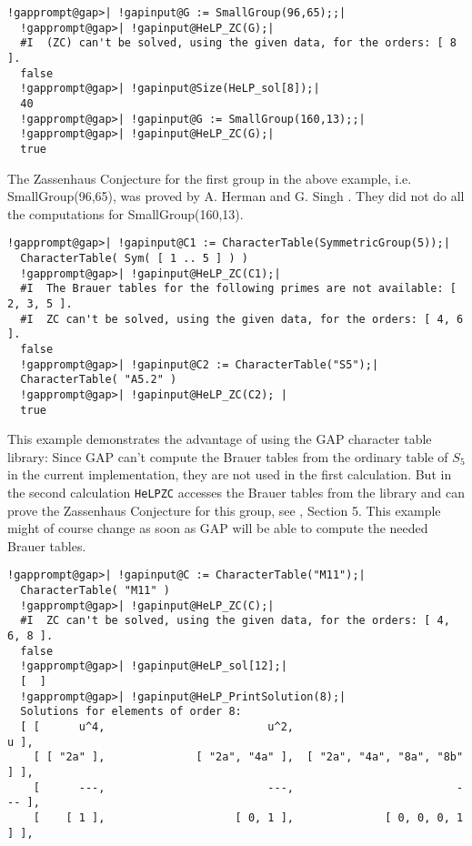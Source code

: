 \documentclass[a4paper,11pt]{report}
\begin{document}
{{\begin{Verbatim}[commandchars=!@|,fontsize=\small,frame=single,label=Example]
  !gapprompt@gap>| !gapinput@G := SmallGroup(96,65);;|
  !gapprompt@gap>| !gapinput@HeLP_ZC(G);|
  #I  (ZC) can't be solved, using the given data, for the orders: [ 8 ].
  false
  !gapprompt@gap>| !gapinput@Size(HeLP_sol[8]);|
  40
  !gapprompt@gap>| !gapinput@G := SmallGroup(160,13);;|
  !gapprompt@gap>| !gapinput@HeLP_ZC(G);|
  true
\end{Verbatim}
 The Zassenhaus Conjecture for the first group in the above example, i.e.
SmallGroup(96,65), was proved by A. Herman and G. Singh \cite{HermanSingh}. They did not do all the computations for SmallGroup(160,13). 
\begin{Verbatim}[commandchars=!@|,fontsize=\small,frame=single,label=Example]
  !gapprompt@gap>| !gapinput@C1 := CharacterTable(SymmetricGroup(5));|
  CharacterTable( Sym( [ 1 .. 5 ] ) )
  !gapprompt@gap>| !gapinput@HeLP_ZC(C1);|
  #I  The Brauer tables for the following primes are not available: [ 2, 3, 5 ].
  #I  ZC can't be solved, using the given data, for the orders: [ 4, 6 ].
  false
  !gapprompt@gap>| !gapinput@C2 := CharacterTable("S5");|
  CharacterTable( "A5.2" )
  !gapprompt@gap>| !gapinput@HeLP_ZC(C2); |
  true
\end{Verbatim}
 This example demonstrates the advantage of using the GAP character table
library: Since GAP can't compute the Brauer tables from the ordinary table of $S_5$ in the current implementation, they are not used in the first calculation. But
in the second calculation \texttt{HeLP{\textunderscore}ZC} accesses the Brauer tables from the library and can prove the Zassenhaus
Conjecture for this group, see \cite{HertweckBrauer}, Section 5. This example might of course change as soon as GAP will be able
to compute the needed Brauer tables. 
\begin{Verbatim}[commandchars=!@|,fontsize=\small,frame=single,label=Example]
  !gapprompt@gap>| !gapinput@C := CharacterTable("M11");|
  CharacterTable( "M11" )
  !gapprompt@gap>| !gapinput@HeLP_ZC(C);|
  #I  ZC can't be solved, using the given data, for the orders: [ 4, 6, 8 ].
  false
  !gapprompt@gap>| !gapinput@HeLP_sol[12];|
  [  ]
  !gapprompt@gap>| !gapinput@HeLP_PrintSolution(8);|
  Solutions for elements of order 8:
  [ [      u^4,                         u^2,                           u ],
    [ [ "2a" ],              [ "2a", "4a" ],  [ "2a", "4a", "8a", "8b" ] ],
    [      ---,                         ---,                         --- ],
    [    [ 1 ],                    [ 0, 1 ],              [ 0, 0, 0, 1 ] ],

\end{Verbatim}}}
\end{document}
